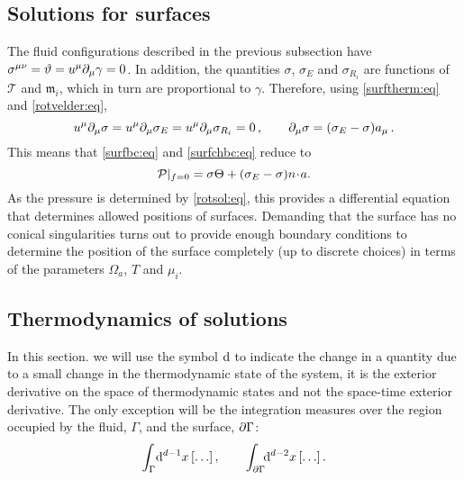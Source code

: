 \documentclass[12pt]{article}
\newcommand{\tloc}{\mathcal{T}}
\newcommand{\ploc}{\mathcal{P}}
\newcommand{\ml}{\mathfrak{m}}
\newcommand{\mg}{\mu}
\newcommand{\vint}{\int_\Gamma\!\dr^{d-1}x}
\newcommand{\aint}{\int_{\p\Gamma}\!\!\dr^{d-2}x}
\begin{document}
\subsection{Solutions for surfaces}\label{sec:rotsurf}

The fluid configurations described in the previous subsection have $\sigma^{\mu\nu}=\vartheta=u^\mu\partial_\mu\gamma=0$.
In addition, the quantities $\sigma$, $\sigma_E$ and $\sigma_{R_i}$ are functions of $\tloc$ and $\ml_i$, which in turn are proportional to $\gamma$.
Therefore, using \eqref{surftherm:eq} and \eqref{rotvelder:eq},
%
\begin{equation}\label{rotsigmagrad:eq}
  u^\mu\partial_\mu\sigma=u^\mu\partial_\mu\sigma_E=u^\mu\partial_\mu\sigma_{R_i}=0\,,
  \qquad
  \partial_\mu \sigma = (\sigma_E - \sigma)a_\mu\,.
\end{equation}
%
This means that \eqref{surfbc:eq} and \eqref{surfchbc:eq} reduce to
%
\begin{equation}\label{rotsurfbc:eq}
  \ploc|_{f=0} = \sigma \Theta + (\sigma_E-\sigma)n\cdt a.
\end{equation}
%
As the pressure is determined by \eqref{rotsol:eq}, this provides a differential equation that determines allowed positions of surfaces. Demanding that the surface has no conical singularities turns out to provide enough boundary conditions to determine the position of the surface completely (up to discrete choices) in terms of the parameters $\Omega_a$, $T$ and $\mg_i$.

\subsection{Thermodynamics of solutions}\label{sec:rottherm}

In this section. we will use the symbol $\mathrm{d}$ to indicate the change in a quantity due to a small change in the thermodynamic state of the system, \ie it is the exterior derivative on the space of thermodynamic states and not the space-time exterior derivative. The only exception will be the integration measures over the region occupied by the fluid, $\Gamma$, and the surface, $\partial\Gamma$:
%
\begin{equation*}
  \vint\brk{\ldots}, \qquad \aint\brk{\ldots}.
\end{equation*}
%
\end{document}
